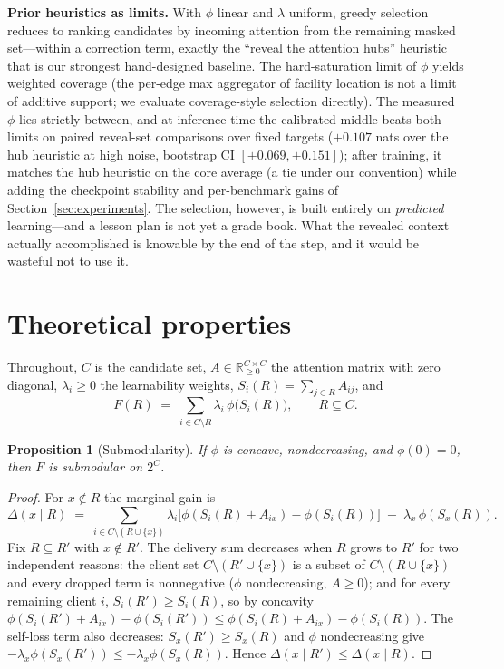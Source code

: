 \documentclass{article} %
\newtheorem{proposition}{Proposition}
\begin{document}
\textbf{Prior heuristics as limits.} With $\phi$ linear and $\lambda$ uniform, greedy selection reduces to ranking candidates by incoming attention from the remaining masked set---within a correction term, exactly the ``reveal the attention hubs'' heuristic that is our strongest hand-designed baseline. The hard-saturation limit of $\phi$ yields weighted coverage (the per-edge max aggregator of facility location is not a limit of additive support; we evaluate coverage-style selection directly). The measured $\phi$ lies strictly between, and at inference time the calibrated middle beats both limits on paired reveal-set comparisons over fixed targets ($+0.107$ nats over the hub heuristic at high noise, bootstrap CI $[+0.069, +0.151]$); after training, it matches the hub heuristic on the core average (a tie under our convention) while adding the checkpoint stability and per-benchmark gains of Section~\ref{sec:experiments}. The selection, however, is built entirely on \emph{predicted} learning---and a lesson plan is not yet a grade book. What the revealed context actually accomplished is knowable by the end of the step, and it would be wasteful not to use it.

\section{Theoretical properties}
\label{app:theory}

Throughout, $C$ is the candidate set, $A \in \mathbb{R}_{\geq 0}^{C \times C}$ the attention matrix with zero diagonal, $\lambda_i \geq 0$ the learnability weights, $S_i(R) = \sum_{j \in R} A_{ij}$, and
\[
F(R) \;=\; \sum_{i \in C \setminus R} \lambda_i\, \phi\big(S_i(R)\big), \qquad R \subseteq C .
\]

\begin{proposition}[Submodularity]
\label{prop:submodular}
If $\phi$ is concave, nondecreasing, and $\phi(0) = 0$, then $F$ is submodular on $2^C$.
\end{proposition}

\begin{proof}
For $x \notin R$ the marginal gain is
\[
\Delta(x \mid R) \;=\; \sum_{i \in C \setminus (R \cup \{x\})} \lambda_i \big[\phi(S_i(R) + A_{ix}) - \phi(S_i(R))\big] \;-\; \lambda_x\, \phi(S_x(R)).
\]
Fix $R \subseteq R'$ with $x \notin R'$. The delivery sum decreases when $R$ grows to $R'$ for two independent reasons: the client set $C \setminus (R' \cup \{x\})$ is a subset of $C \setminus (R \cup \{x\})$ and every dropped term is nonnegative ($\phi$ nondecreasing, $A \geq 0$); and for every remaining client $i$, $S_i(R') \geq S_i(R)$, so by concavity $\phi(S_i(R') + A_{ix}) - \phi(S_i(R')) \leq \phi(S_i(R) + A_{ix}) - \phi(S_i(R))$. The self-loss term also decreases: $S_x(R') \geq S_x(R)$ and $\phi$ nondecreasing give $-\lambda_x \phi(S_x(R')) \leq -\lambda_x \phi(S_x(R))$. Hence $\Delta(x \mid R') \leq \Delta(x \mid R)$.
\end{proof}
\end{document}
